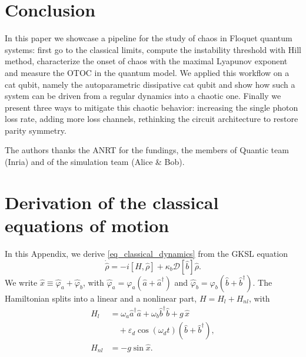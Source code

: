 \documentclass[aps,prx,reprint,floatfix,amsmath,amssymb,longbibliography]{revtex4-2}
\newcommand{\eps}{\varepsilon}
\newcommand{\da}{^\dagger}
\newcommand{\ha}{\hat{a}}
\newcommand{\hb}{\hat{b}}
\begin{document}
\section{Conclusion}
In this paper we showcase a pipeline for the study of chaos in Floquet quantum systems: first go to the classical limits, compute the instability threshold with Hill method, characterize the onset of chaos with the maximal Lyapunov exponent and measure the OTOC in the quantum model. We applied this workflow on a cat qubit, namely the autoparametric dissipative cat qubit and show how such a system can be driven from a regular dynamics into a chaotic one. Finally we present three ways to mitigate this chaotic behavior: increasing the single photon loss rate, adding more loss channels, rethinking the circuit architecture to restore parity symmetry.

\begin{acknowledgments}
The authors thanks the ANRT for the fundings, the members of Quantic team (Inria) and of the simulation team (Alice \& Bob).

\end{acknowledgments}

\appendix
\section{Derivation of the classical equations of motion}
\label{app:derivation_classical_equation}

In this Appendix, we derive \cref{eq_classical_dynamics} from the GKSL equation
\begin{equation}
    \dot{\hat\rho} = -i[H,\hat\rho] + \kappa_b\mathcal{D}[\hb]\hat\rho .
    \label{eq_app_GKSL}
\end{equation}
We write $\hat x\equiv\hat\varphi_a+\hat\varphi_b$, with $\hat\varphi_a=\varphi_a(\ha+\ha\da)$ and $\hat\varphi_b=\varphi_b(\hb+\hb\da)$. The Hamiltonian splits into a linear and a nonlinear part, $H=H_l+H_{nl}$, with
\begin{align}
    H_l &= \omega_a\ha\da\ha+\omega_b\hb\da\hb+g\,\hat x \nonumber\\
        &\quad +\eps_d\cos(\omega_d t)(\hb+\hb\da),\\
    H_{nl} &= -g\sin\hat x .
\end{align}
\end{document}
